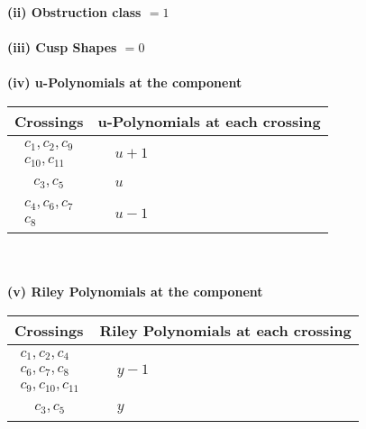 \documentclass[1p]{elsarticle_modified}
\theoremstyle{definition}
\begin{document}
\flushleft \textbf{(ii) Obstruction class $= 1$}\\~\\
\flushleft \textbf{(iii) Cusp Shapes $= 0$}\\~\\
\newpage\renewcommand{\arraystretch}{1}
\flushleft \textbf{(iv) u-Polynomials at the component}\newline \\
\begin{tabular}{m{50pt}|m{274pt}}
Crossings & \hspace{64pt}u-Polynomials at each crossing \\
\hline $$\begin{aligned}c_{1},c_{2},c_{9}\\c_{10},c_{11}\end{aligned}$$&$\begin{aligned}
&u+1
\end{aligned}$\\
\hline $$\begin{aligned}c_{3},c_{5}\end{aligned}$$&$\begin{aligned}
&u
\end{aligned}$\\
\hline $$\begin{aligned}c_{4},c_{6},c_{7}\\c_{8}\end{aligned}$$&$\begin{aligned}
&u-1
\end{aligned}$\\
\hline
\end{tabular}\\~\\
\newpage\renewcommand{\arraystretch}{1}
\flushleft \textbf{(v) Riley Polynomials at the component}\newline \\
\begin{tabular}{m{50pt}|m{274pt}}
Crossings & \hspace{64pt}Riley Polynomials at each crossing \\
\hline $$\begin{aligned}c_{1},c_{2},c_{4}\\c_{6},c_{7},c_{8}\\c_{9},c_{10},c_{11}\end{aligned}$$&$\begin{aligned}
&y-1
\end{aligned}$\\
\hline $$\begin{aligned}c_{3},c_{5}\end{aligned}$$&$\begin{aligned}
&y
\end{aligned}$\\
\hline
\end{tabular}\\~\\
\end{document}
